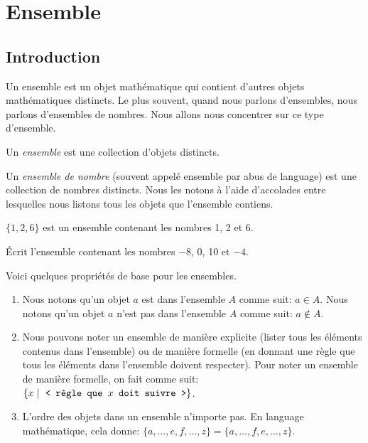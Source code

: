 \chapter{Ensemble}

\section{Introduction}

Un ensemble est un objet mathématique qui contient d'autres objets mathématiques distincts. Le plus souvent, quand nous parlons d'ensembles, nous parlons d'ensembles de nombres. Nous allons nous concentrer sur ce type d'ensemble.

\begin{definition}
    Un \emph{ensemble} est une collection d'objets distincts.
\end{definition}

\begin{definition}
    Un \emph{ensemble de nombre} (souvent appelé ensemble par abus de language) est une collection de nombres distincts. Nous les notons à l'aide d'accolades entre lesquelles nous listons tous les objets que l'ensemble contiens.
\end{definition}
\begin{exemple}
    $\{1, 2, 6\}$ est un ensemble contenant les nombres 1, 2 et 6.
\end{exemple}
\begin{exercice}
    Écrit l'ensemble contenant les nombres $-8$, 0, 10 et $-4$.
\end{exercice}

\begin{propriete}
    Voici quelques propriétés de base pour les ensembles.
    \begin{enumerate}
        \item Nous notons qu'un objet $a$ est dans l'ensemble $A$ comme suit: $a\in A$. Nous notons qu'un objet $a$ n'est pas dans l'ensemble $A$ comme suit: $a\not\in A$.
        \item Nous pouvons noter un ensemble de manière explicite (lister tous les éléments contenus dans l'ensemble) ou de manière formelle (en donnant une règle que tous les éléments dans l'ensemble doivent respecter). Pour noter un ensemble de manière formelle, on fait comme suit: $\{x \mid~\text{\ttfamily <~règle que $x$ doit suivre~>}\}$.
        \item L'ordre des objets dans un ensemble n'importe pas. En language mathématique, cela donne: $\{a, \dots, e, f, \dots, z\} = \{a, \dots, f, e, \dots, z\}$.
    \end{enumerate}
\end{propriete}

